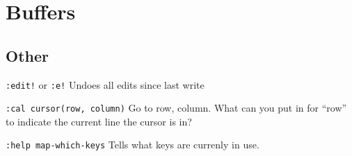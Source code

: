 \documentclass[12pt]{article}
\begin{document}
\section{Buffers}

\subsection{Other}
\par\texttt{:edit!} or \texttt{:e!} Undoes all edits since last write
\par\texttt{:cal cursor(row, column)} Go to row, column. What can you put
in for ``row'' to indicate the current line the cursor is in?
\par\texttt{:help map-which-keys} Tells what keys are currenly in use.
\end{document}
